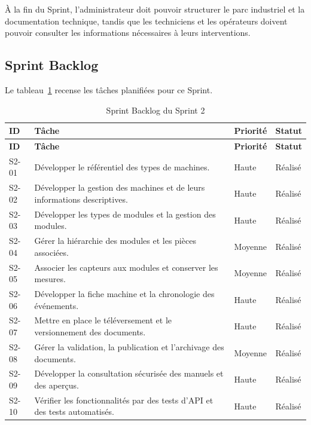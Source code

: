 À la fin du Sprint, l'administrateur doit pouvoir structurer le parc industriel et la documentation technique, tandis que les techniciens et les opérateurs doivent pouvoir consulter les informations nécessaires à leurs interventions.

\subsection{Sprint Backlog}

Le tableau~\ref{tab:sprint2-backlog} recense les tâches planifiées pour ce Sprint.

{\small
\setlength{\tabcolsep}{5pt}
\begin{longtable}{|p{1cm}|p{10.3cm}|p{1.5cm}|p{1.4cm}|}
\caption{Sprint Backlog du Sprint 2}
\label{tab:sprint2-backlog}\\
\hline
\textbf{ID} & \textbf{Tâche} & \textbf{Priorité} & \textbf{Statut} \\
\hline
\endfirsthead

\hline
\textbf{ID} & \textbf{Tâche} & \textbf{Priorité} & \textbf{Statut} \\
\hline
\endhead

S2-01 &
Développer le référentiel des types de machines. &
Haute & Réalisé \\
\hline

S2-02 &
Développer la gestion des machines et de leurs informations descriptives. &
Haute & Réalisé \\
\hline

S2-03 &
Développer les types de modules et la gestion des modules. &
Haute & Réalisé \\
\hline

S2-04 &
Gérer la hiérarchie des modules et les pièces associées. &
Moyenne & Réalisé \\
\hline

S2-05 &
Associer les capteurs aux modules et conserver les mesures. &
Moyenne & Réalisé \\
\hline

S2-06 &
Développer la fiche machine et la chronologie des événements. &
Haute & Réalisé \\
\hline

S2-07 &
Mettre en place le téléversement et le versionnement des documents. &
Haute & Réalisé \\
\hline

S2-08 &
Gérer la validation, la publication et l'archivage des documents. &
Moyenne & Réalisé \\
\hline

S2-09 &
Développer la consultation sécurisée des manuels et des aperçus. &
Haute & Réalisé \\
\hline

S2-10 &
Vérifier les fonctionnalités par des tests d'API et des tests automatisés. &
Haute & Réalisé \\
\hline

\end{longtable}}


